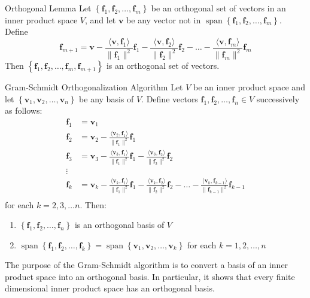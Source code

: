 \documentclass[12pt]{article}
\begin{document}
\begin{lemma}{Orthogonal Lemma}{}
    Let $ \left\{ \mathbf{f}_1, \mathbf{f}_2, \dots, \mathbf{f}_m \right\} $ be an orthogonal set of vectors in an inner product space $ V $, and let $ \mathbf{v} $ be any vector not in $ \operatorname{span} \left\{ \mathbf{f}_1, \mathbf{f}_2, \dots, \mathbf{f}_m \right\} $. Define
    \[ \mathbf{f}_{m + 1} = \mathbf{v} - \frac{\langle \mathbf{v}, \mathbf{f}_1 \rangle}{\lVert \mathbf{f}_1 \rVert^2} \mathbf{f}_1 - \frac{\langle \mathbf{v}, \mathbf{f}_2 \rangle}{\lVert \mathbf{f}_2 \rVert^2} \mathbf{f}_2 - \dots - \frac{\langle \mathbf{v}, \mathbf{f}_m \rangle}{\lVert \mathbf{f}_m \rVert^2} \mathbf{f}_m \]
    Then $ \left\{ \mathbf{f}_1, \mathbf{f}_2, \dots, \mathbf{f}_m, \mathbf{f}_{m + 1} \right\} $ is an orthogonal set of vectors.
\end{lemma}

\begin{theorem}{Gram-Schmidt Orthogonalization Algorithm}{}
    Let $ V $ be an inner product space and let $ \left\{ \mathbf{v}_1, \mathbf{v}_2, \dots, \mathbf{v}_n \right\} $ be any basis of $ V $. Define vectors $ \mathbf{f}_1, \mathbf{f}_2, \dots, \mathbf{f}_n \in V $ successively as follows: 
    \begin{align*}
        \mathbf{f}_1 & = \mathbf{v}_1 \\
        \mathbf{f}_2 & = \mathbf{v}_2 - \frac{\langle \mathbf{v}_2, \mathbf{f}_1 \rangle}{\lVert \mathbf{f}_1 \rVert^2} \mathbf{f}_1 \\
        \mathbf{f}_3 & = \mathbf{v}_3 - \frac{\langle \mathbf{v}_3, \mathbf{f}_1 \rangle}{\lVert \mathbf{f}_1 \rVert^2} \mathbf{f}_1 - \frac{\langle \mathbf{v}_3, \mathbf{f}_2 \rangle}{\lVert \mathbf{f}_2 \rVert^2} \mathbf{f}_2 \\
        \vdots \\
        \mathbf{f}_k & = \mathbf{v}_k - \frac{\langle \mathbf{v}_k, \mathbf{f}_1 \rangle}{\lVert \mathbf{f}_1 \rVert^2} \mathbf{f}_1 - \frac{\langle \mathbf{v}_k, \mathbf{f}_2 \rangle}{\lVert \mathbf{f}_2 \rVert^2} \mathbf{f}_2 - \dots - \frac{\langle \mathbf{v}_k, \mathbf{f}_{k - 1} \rangle}{\lVert \mathbf{f}_{k - 1} \rVert^2} \mathbf{f}_{k - 1} \\
    \end{align*}
    for each $ k = 2, 3, \dots n $. Then:
    \begin{enumerate}[label=(\roman*)]
        \item $ \left\{ \mathbf{f}_1, \mathbf{f}_2, \dots, \mathbf{f}_n \right\} $ is an orthogonal basis of $ V $
        \item $ \operatorname{span} \left\{ \mathbf{f}_1, \mathbf{f}_2, \dots, \mathbf{f}_k \right\} = \operatorname{span} \left\{ \mathbf{v}_1, \mathbf{v}_2, \dots, \mathbf{v}_k \right\} $ for each $ k = 1, 2, \dots, n $
    \end{enumerate}
    The purpose of the Gram-Schmidt algorithm is to convert a basis of an inner product space into an orthogonal basis. In particular, it shows that every finite dimensional inner product space has an orthogonal basis.
\end{theorem}
\end{document}
